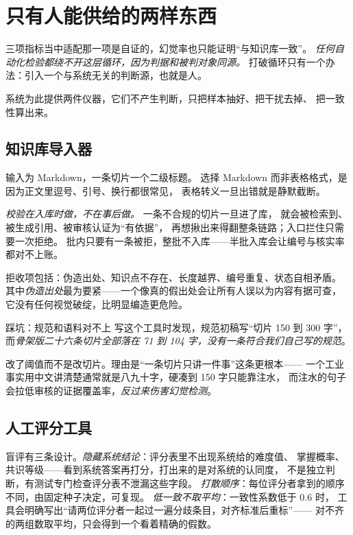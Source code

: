 \section{只有人能供给的两样东西}

三项指标当中适配那一项是自证的，幻觉率也只能证明“与知识库一致”。
\emph{任何自动化检验都绕不开这层循环，因为判据和被判对象同源。}
打破循环只有一个办法：引入一个与系统无关的判断源，也就是人。

系统为此提供两件仪器，它们不产生判断，只把样本抽好、把干扰去掉、
把一致性算出来。

\subsection{知识库导入器}

输入为 Markdown，一条切片一个二级标题。
选择 Markdown 而非表格格式，是因为正文里逗号、引号、换行都很常见，
表格转义一旦出错就是静默截断。

\emph{校验在入库时做，不在事后做。} 一条不合规的切片一旦进了库，
就会被检索到、被生成引用、被审核认证为“有依据”，
再想揪出来得翻整条链路；入口拦住只需要一次拒绝。
批内只要有一条被拒，整批不入库——半批入库会让编号与核实率都对不上账。

拒收项包括：伪造出处、知识点不存在、长度越界、编号重复、状态自相矛盾。
其中\emph{伪造出处}最为要紧——一个像真的假出处会让所有人误以为内容有据可查，
它没有任何视觉破绽，比明显编造更危险。

\begin{keynote}{踩坑：规范和语料对不上}
写这个工具时发现，规范初稿写“切片 150 到 300 字”，
而\emph{骨架版二十六条切片全部落在 71 到 104 字，没有一条符合我们自己写的规范}。

改了阈值而不是改切片。理由是“一条切片只讲一件事”这条更根本——
一个工业事实用中文讲清楚通常就是八九十字，硬凑到 150 字只能靠注水，
而注水的句子会拉低审核的证据覆盖率，\emph{反过来伤害幻觉检测}。
\end{keynote}

\subsection{人工评分工具}

盲评有三条设计。\emph{隐藏系统结论}：评分表里不出现系统给的难度值、
掌握概率、共识等级——看到系统答案再打分，打出来的是对系统的认同度，
不是独立判断，有测试专门检查评分表不泄漏这些字段。
\emph{打散顺序}：每位评分者拿到的顺序不同，由固定种子决定，可复现。
\emph{低一致不取平均}：一致性系数低于 $0.6$ 时，
工具会明确写出“请两位评分者一起过一遍分歧条目，对齐标准后重标”——
对不齐的两组数取平均，只会得到一个看着精确的假数。

